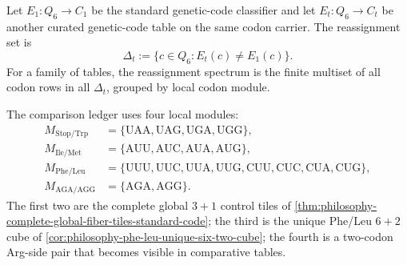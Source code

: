 \begin{definition}
\label{def:philosophy-alternative-code-reassignment-spectrum}
Let $E_{1}:Q_{6}\to C_{1}$ be the standard genetic-code classifier and
let $E_{t}:Q_{6}\to C_{t}$ be another curated genetic-code table on the
same codon carrier. The reassignment set is
$$
  \Delta_{t}:=\{c\in Q_{6}:E_{t}(c)\neq E_{1}(c)\}.
$$
For a family of tables, the reassignment spectrum is the finite multiset
of all codon rows in all $\Delta_{t}$, grouped by local codon module.
\end{definition}

\begin{definition}
\label{def:philosophy-four-reassignment-modules}
The comparison ledger uses four local modules:
$$
\begin{aligned}
  M_{\mathrm{Stop/Trp}}
    &=\{\mathrm{UAA},\mathrm{UAG},\mathrm{UGA},\mathrm{UGG}\},\\
  M_{\mathrm{Ile/Met}}
    &=\{\mathrm{AUU},\mathrm{AUC},\mathrm{AUA},\mathrm{AUG}\},\\
  M_{\mathrm{Phe/Leu}}
    &=\{\mathrm{UUU},\mathrm{UUC},\mathrm{UUA},\mathrm{UUG},
      \mathrm{CUU},\mathrm{CUC},\mathrm{CUA},\mathrm{CUG}\},\\
  M_{\mathrm{AGA/AGG}}
    &=\{\mathrm{AGA},\mathrm{AGG}\}.
\end{aligned}
$$
The first two are the complete global $3+1$ control tiles of
\autoref{thm:philosophy-complete-global-fiber-tiles-standard-code};
the third is the unique Phe/Leu $6+2$ cube of
\autoref{cor:philosophy-phe-leu-unique-six-two-cube}; the fourth is a
two-codon Arg-side pair that becomes visible in comparative tables.
\end{definition}

